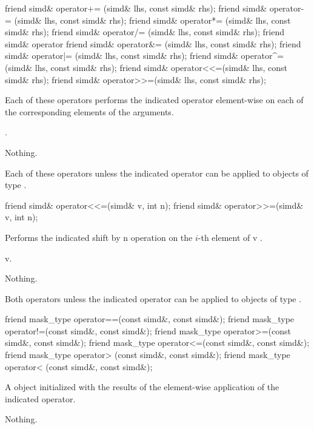 \begin{itemdecl}
friend simd& operator+= (simd& lhs, const simd& rhs);
friend simd& operator-= (simd& lhs, const simd& rhs);
friend simd& operator*= (simd& lhs, const simd& rhs);
friend simd& operator/= (simd& lhs, const simd& rhs);
friend simd& operator%
friend simd& operator&= (simd& lhs, const simd& rhs);
friend simd& operator|= (simd& lhs, const simd& rhs);
friend simd& operator^= (simd& lhs, const simd& rhs);
friend simd& operator<<=(simd& lhs, const simd& rhs);
friend simd& operator>>=(simd& lhs, const simd& rhs);
\end{itemdecl}
\begin{itemdescr}
  \pnum\effects Each of these operators performs the indicated operator element-wise on each of the corresponding elements of the arguments.

  \pnum\returns {}.

  \pnum\throws Nothing.

  \pnum\remarks Each of these operators \specialsfinae unless the indicated operator can be applied to objects of type .
\end{itemdescr}

\begin{itemdecl}
friend simd& operator<<=(simd& v, int n);
friend simd& operator>>=(simd& v, int n);
\end{itemdecl}
\begin{itemdescr}
  \pnum\effects Performs the indicated shift by \code n operation on the $i$-th element of \code v \foralli.

  \pnum\returns \code v.

  \pnum\throws Nothing.

  \pnum\remarks Both operators \specialsfinae unless the indicated operator can be applied to objects of type .
\end{itemdescr}

\begin{itemdecl}
friend mask_type operator==(const simd&, const simd&);
friend mask_type operator!=(const simd&, const simd&);
friend mask_type operator>=(const simd&, const simd&);
friend mask_type operator<=(const simd&, const simd&);
friend mask_type operator> (const simd&, const simd&);
friend mask_type operator< (const simd&, const simd&);
\end{itemdecl}
\begin{itemdescr}
  \pnum\returns A \mask object initialized with the results of the element-wise application of the indicated operator.

  \pnum\throws Nothing.
\end{itemdescr}

